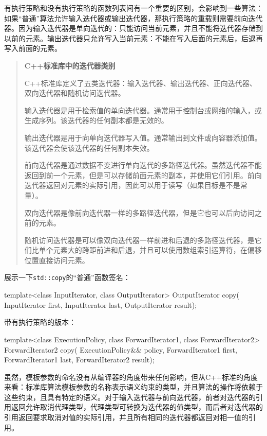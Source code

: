 有执行策略和没有执行策略的函数列表间有一个重要的区别，会影响到一些算法：如果“普通”算法允许输入迭代器或输出迭代器，那执行策略的重载则需要前向迭代器。因为输入迭代器是单向迭代的：只能访问当前元素，并且不能将迭代器存储到以前的元素。输出迭代器只允许写入当前元素：不能在写入后面的元素后，后退再写入前面的元素。

\begin{quote}
     \textbf{C++标准库中的迭代器类别}

     C++标准库定义了五类迭代器：输入迭代器、输出迭代器、正向迭代器、双向迭代器和随机访问迭代器。

     输入迭代器是用于检索值的单向迭代器。通常用于控制台或网络的输入，或生成序列。该迭代器的任何副本都是无效的。

     输出迭代器是用于向单向迭代器写入值。通常输出到文件或向容器添加值。该迭代器会使该迭代器的任何副本失效。

     前向迭代器是通过数据不变进行单向迭代的多路径迭代器。虽然迭代器不能返回到前一个元素，但是可以存储前面元素的副本，并使用它们引用。前向迭代器返回对元素的实际引用，因此可以用于读写（如果目标是不是常量）。

     双向迭代器是像前向迭代器一样的多路径迭代器，但是它也可以后向访问之前的元素。

     随机访问迭代器是可以像双向迭代器一样前进和后退的多路径迭代器，是它们比单个元素大的跨距前进和后退，并且可以使用数组索引运算符，在偏移位置直接访问元素。
\end{quote}

展示一下\texttt{std::copy}的“普通”函数签名：

\begin{cpp}
template<class InputIterator, class OutputIterator>
OutputIterator copy(
  InputIterator first, InputIterator last, OutputIterator result);
\end{cpp}

带有执行策略的版本：

\begin{cpp}
template<class ExecutionPolicy,
  class ForwardIterator1, class ForwardIterator2>
ForwardIterator2 copy(
  ExecutionPolicy&& policy,
  ForwardIterator1 first, ForwardIterator1 last,
  ForwardIterator2 result);
\end{cpp}

虽然，模板参数的命名没有从编译器的角度带来任何影响，但从C++标准的角度来看：标准库算法模板参数的名称表示语义约束的类型，并且算法的操作将依赖于这些约束，且具有特定的语义。对于输入迭代器与前向迭代器，前者对迭代器的引用返回允许取消代理类型，代理类型可转换为迭代器的值类型，而后者对迭代器的引用返回要求取消对值的实际引用，并且所有相同的迭代器都返回对相一值的引用。

